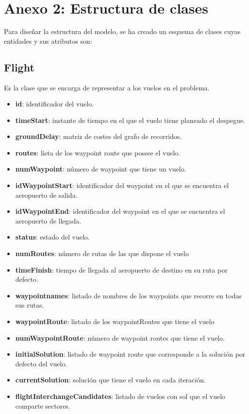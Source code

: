 \chapter{Anexo 2: Estructura de clases}
\label{anexo2}
Para diseñar la estructura del modelo, se ha creado un esquema de clases cuyas entidades y sus atributos son:
\section{Flight}
Es la clase que se encarga de representar a los vuelos en el problema.
\begin{itemize}
	\item \textbf{id}: identificador del vuelo.
	\item \textbf{timeStart}: instante de tiempo en el que el vuelo tiene planeado el despegue.
	\item \textbf{groundDelay}: matriz de costes del grafo de recorridos.
	\item \textbf{routes}: lista de los waypoint route que possee el vuelo.
	\item \textbf{numWaypoint}: número de waypoint que tiene un vuelo.
	\item \textbf{idWaypointStart}: identificador del waypoint en el que se encuentra el aeropuerto de salida.
	\item \textbf{idWaypointEnd}: identificador del waypoint en el que se encuentra el aeropuerto de llegada.
	\item \textbf{status}: estado del vuelo.
	\item \textbf{numRoutes}: número de rutas de las que dispone el vuelo
	\item \textbf{timeFinish}: tiempo de llegada al aeropuerto de destino en su ruta por defecto.
	\item \textbf{waypointnames}: listado de nombres de los waypoints que recorre en todas sus rutas.
	\item \textbf{waypointRoute}: listado de los waypointRoutes que tiene el vuelo
	\item \textbf{numWaypointRoute}: número de waypoint routes que tiene el vuelo.
	\item \textbf{initialSolution}: listado de waypoint route que corresponde a la solución por defecto del vuelo.
	\item \textbf{currentSolution}: solución que tiene el vuelo en cada iteración.
	\item \textbf{flightInterchangeCandidates}: listado de vuelos con sol que el vuelo comparte sectores.
\end{itemize}

